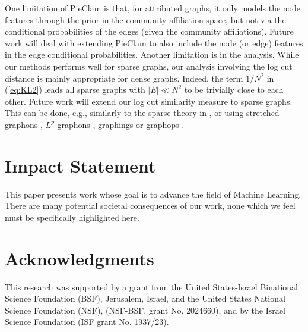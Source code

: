 \documentclass{article}
\theoremstyle{plain}
\theoremstyle{definition}
\theoremstyle{remark}
\begin{document}
One limitation of PieClam is that, for attributed graphs, it only models the node features through the prior in the community affiliation space, but not via the conditional probabilities of the edges (given the community affiliations). Future work will deal with extending PieClam to also include the node (or edge) features in the edge conditional probabilities. 
Another limitation is in the analysis. While our methods performs well for sparse graphs, our analysis involving the log cut distance is mainly appropriate for dense graphs. Indeed, the term $1/N^2$ in (\ref{eq:KL2}) leads all sparse graphs  with $|E|\ll N^2$  to be trivially close to each other.  Future work will extend our log cut similarity measure  to sparse graphs.  This can be done, e.g., similarly to the sparse theory in \cite{Levie_intersecting_reg_24}, or using stretched graphons \cite{JMLR:v18:16-421}, $L^p$ graphons \cite{Borgs2014AnT}, graphings \cite{cut-homo3} or graphops \cite{Backhausz2018ActionCO}.


\section*{Impact Statement}
This paper presents work whose goal is to advance the field of 
Machine Learning. There are many potential societal consequences 
of our work, none which we feel must be specifically highlighted here.

\section*{Acknowledgments}

This research was supported by a grant from the United States-Israel Binational Science Foundation (BSF), Jerusalem, Israel, and the United States National Science Foundation (NSF), (NSF-BSF, grant No. 2024660), and by the Israel Science Foundation (ISF grant No. 1937/23).



\[\]



\clearpage


\end{document}
